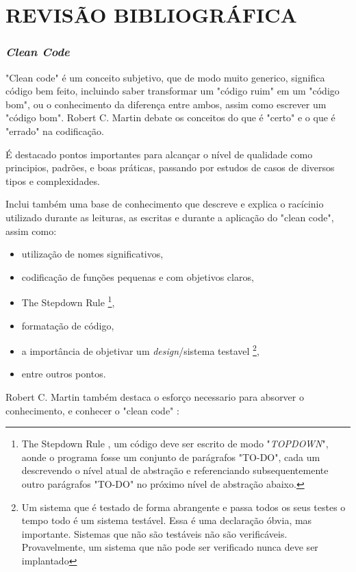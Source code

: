 \documentclass[12pt]{article}
\begin{document}
\part{REVISÃO BIBLIOGRÁFICA} \label{sec:revisaobibliografica}
\section{\textit{Clean Code}} \label{sec:cleancode}

"Clean code" \cite{ROBERT_MARTIN_CLEAN_CODE} é um conceito subjetivo, que de modo muito generico, significa código bem feito, incluindo saber transformar um "código ruim" em um "código bom", ou o conhecimento da diferença entre ambos, assim como escrever um "código bom". Robert C. Martin \cite{ROBERT_MARTIN_CLEAN_CODE} debate os conceitos do que é "certo" e o que é "errado" na codificação.

É destacado pontos importantes para alcançar o nível de qualidade como principios, padrões, e boas práticas, passando por estudos de casos de diversos tipos e complexidades.

Inclui também uma base de conhecimento que descreve e explica o racícinio utilizado durante as leituras, as escritas e durante a aplicação do "clean code", assim como:
\begin{itemize}
 \item utilização de nomes significativos,
 \item codificação de funções pequenas e com objetivos claros,
 \item The Stepdown Rule \footnote{The Stepdown Rule \cite{ROBERT_MARTIN_CLEAN_CODE}, um código deve ser escrito de modo "\textit{TOPDOWN}", aonde o programa fosse um conjunto de parágrafos "TO-DO", cada um descrevendo o nível atual de abstração e referenciando subsequentemente outro parágrafos "TO-DO" no próximo nível de abstração abaixo.},
 \item formatação de código,
 \item a importância de objetivar um \textit{design}/sistema testavel \footnote{Um sistema que é testado de forma abrangente e passa todos os seus testes o tempo todo é um sistema testável. Essa é uma declaração óbvia, mas importante. Sistemas que não são testáveis
não são verificáveis. Provavelmente, um sistema que não pode ser verificado nunca deve ser implantado},
 \item entre outros pontos. 
\end{itemize}
Robert C. Martin \cite{ROBERT_MARTIN_CLEAN_CODE} também destaca o esforço necessario para absorver o conhecimento, e conhecer o "clean code" \cite{ROBERT_MARTIN_CLEAN_CODE}:
\end{document}
